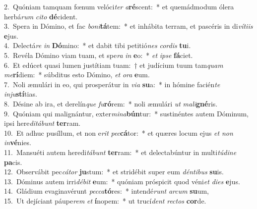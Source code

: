{2.~}Quóniam tamquam fœnum velóci\textit{ter} \textit{a}\textbf{ré}scent:~* et quemádmodum ólera herbá\textit{rum} \textit{ci}\textit{to} \textbf{dé}cident.\\
{3.~}Spera in Dómino, et fac \textit{bo}\textit{ni}\textbf{tá}tem:~* et inhábita terram, et pascéris in di\textit{ví}\textit{ti}\textit{is} \textbf{e}jus.\\
{4.~}Delectá\textit{re} \textit{in} \textbf{Dó}mino:~* et dabit tibi petitió\textit{nes} \textit{cor}\textit{dis} \textbf{tu}i.\\
{5.~}Revéla Dómino viam tuam, et spe\textit{ra} \textit{in} \textbf{e}o:~* \textit{et} \textit{i}\textit{pse} \textbf{fá}ciet.\\
{6.~}Et edúcet quasi lumen justítiam tuam:~† et judícium tuum tam\textit{quam} \textit{me}\textbf{rí}diem:~* súbditus esto Dómino, \textit{et} \textit{o}\textit{ra} \textbf{e}um.\\
{7.~}Noli æmulári in eo, qui prosperátur in \textit{vi}\textit{a} \textbf{su}a:~* in hómine facién\textit{te} \textit{in}\textit{ju}\textbf{stí}tias.\\
{8.~}Désine ab ira, et derelín\textit{que} \textit{fu}\textbf{ró}rem:~* noli æmulári \textit{ut} \textit{ma}\textit{li}\textbf{gné}ris.\\
{9.~}Quóniam qui malignántur, exter\textit{mi}\textit{na}\textbf{bún}tur:~* sustinéntes autem Dóminum, ipsi here\textit{di}\textit{tá}\textit{bunt} \textbf{ter}ram.\\
{10.~}Et adhuc pusíllum, et non e\textit{rit} \textit{pec}\textbf{cá}tor:~* et quæres locum ejus \textit{et} \textit{non} \textit{in}\textbf{vé}nies.\\
{11.~}Mansuéti autem heredi\textit{tá}\textit{bunt} \textbf{ter}ram:~* et delectabúntur in multi\textit{tú}\textit{di}\textit{ne} \textbf{pa}cis.\\
{12.~}Observábit pec\textit{cá}\textit{tor} \textbf{ju}stum:~* et stridébit super eum \textit{dén}\textit{ti}\textit{bus} \textbf{su}is.\\
{13.~}Dóminus autem irri\textit{dé}\textit{bit} \textbf{e}um:~* quóniam próspicit quod véni\textit{et} \textit{di}\textit{es} \textbf{e}jus.\\
{14.~}Gládium evaginavérunt \textit{pec}\textit{ca}\textbf{tó}res:~* intendé\textit{runt} \textit{ar}\textit{cum} \textbf{su}um,\\
{15.~}Ut dejíciant páupe\textit{rem} \textit{et} \textbf{í}nopem:~* ut trucí\textit{dent} \textit{re}\textit{ctos} \textbf{cor}de.\\
